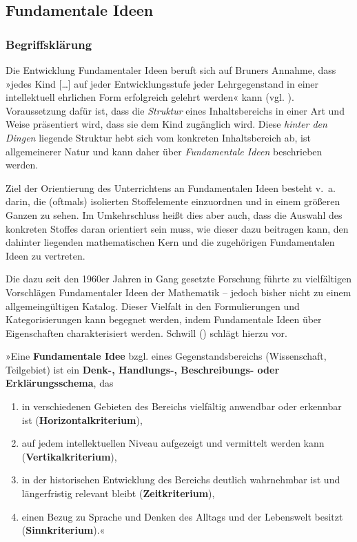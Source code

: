 \documentclass[
]{scrbook}
\providecommand{\tightlist}{%
  \setlength{\itemsep}{0pt}\setlength{\parskip}{0pt}}
\theoremstyle{definition}
\theoremstyle{definition}
\theoremstyle{definition}
\theoremstyle{definition}
\theoremstyle{remark}
\begin{document}
\subsection{Fundamentale Ideen}\label{fundamentale-ideen}

\subsubsection{Begriffsklärung}\label{fundamentale-ideen-begriffsklaerung}

Die Entwicklung Fundamentaler Ideen beruft sich auf Bruners Annahme, dass »jedes Kind {[}\ldots{]} auf jeder Entwicklungsstufe jeder Lehrgegenstand in einer intellektuell ehrlichen Form erfolgreich gelehrt werden« kann (vgl. ). Voraussetzung dafür ist, dass die \emph{Struktur} eines Inhaltsbereichs in einer Art und Weise präsentiert wird, dass sie dem Kind zugänglich wird. Diese \emph{hinter den Dingen} liegende Struktur hebt sich vom konkreten Inhaltsbereich ab, ist allgemeinerer Natur und kann daher über \emph{Fundamentale Ideen} beschrieben werden.

Ziel der Orientierung des Unterrichtens an Fundamentalen Ideen besteht v.~a. darin, die (oftmals) isolierten Stoffelemente einzuordnen und in einem größeren Ganzen zu sehen. Im Umkehrschluss heißt dies aber auch, dass die Auswahl des konkreten Stoffes daran orientiert sein muss, wie dieser dazu beitragen kann, den dahinter liegenden mathematischen Kern und die zugehörigen Fundamentalen Ideen zu vertreten.

Die dazu seit den 1960er Jahren in Gang gesetzte Forschung führte zu vielfältigen Vorschlägen Fundamentaler Ideen der Mathematik -- jedoch bisher nicht zu einem allgemeingültigen Katalog. Dieser Vielfalt in den Formulierungen und Kategorisierungen kann begegnet werden, indem Fundamentale Ideen über Eigenschaften charakterisiert werden. Schwill () schlägt hierzu vor.

»Eine \textbf{Fundamentale Idee} bzgl. eines Gegenstandsbereichs (Wissenschaft, Teilgebiet) ist ein \textbf{Denk-, Handlungs-, Beschreibungs- oder Erklärungsschema}, das

\begin{enumerate}
\def\labelenumi{\arabic{enumi}.}
\tightlist
\item
  in verschiedenen Gebieten des Bereichs vielfältig anwendbar oder erkennbar ist (\textbf{Horizontalkriterium}),
\item
  auf jedem intellektuellen Niveau aufgezeigt und vermittelt werden kann (\textbf{Vertikalkriterium}),
\item
  in der historischen Entwicklung des Bereichs deutlich wahrnehmbar ist und längerfristig relevant bleibt (\textbf{Zeitkriterium}),
\item
  einen Bezug zu Sprache und Denken des Alltags und der Lebenswelt besitzt (\textbf{Sinnkriterium}).«
\end{enumerate}
\end{document}
